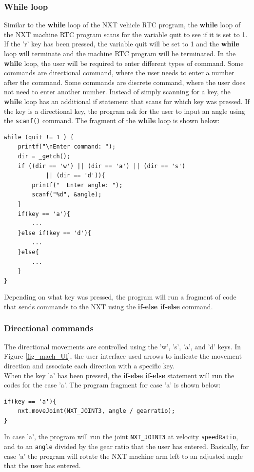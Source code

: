 \documentclass[11pt]{article}
\begin{document}
\subsubsection*{While loop}
Similar to the {\bf while} loop of the NXT vehicle RTC program, the {\bf while} 
loop of the NXT machine RTC program scans for the variable quit to see if it is 
set to 1. If the 'r' key has been pressed, the variable quit will be set to 1 
and the {\bf while} loop will terminate and the machine RTC program will be 
terminated. In the {\bf while} loop, the user will be required to enter different 
types of command. Some commands are directional command, where the user needs to 
enter a number after the command. Some commands are discrete command, where the 
user does not need to enter another number. Instead of simply scanning for a key, 
the {\bf while} loop has an additional if statement that scans for which key was 
pressed. If the key is a directional key, the program ask for the user to input an 
angle using the {\tt scanf()} command. The fragment of the {\bf while} loop is 
shown below:
\begin{lstlisting}
while (quit != 1 ) {
    printf("\nEnter command: ");
    dir = _getch();
    if ((dir == 'w') || (dir == 'a') || (dir == 's') 
            || (dir == 'd')){
        printf("  Enter angle: ");
        scanf("%d", &angle);
    }
    if(key == 'a'){
        ...
    }else if(key == 'd'){
        ...
    }else{
        ...
    }
}
\end{lstlisting}
Depending on what key was pressed, the program will run a fragment of code that 
sends commands to the NXT using the {\bf if-else if-else} command.

\subsubsection*{Directional commands}
The directional movements are controlled using the 'w', 's', 'a', and 'd' keys.
In Figure \ref{fig_mach_UI}, the user interface used arrows to indicate the 
movement direction and associate each direction with a specific key.\\

When the key 'a' has been pressed, the {\bf if-else if-else} statement will run 
the codes for the case 'a'. The program fragment for case 'a' is shown below:
\begin{lstlisting}
if(key == 'a'){
    nxt.moveJoint(NXT_JOINT3, angle / gearratio);
}
\end{lstlisting}
In case 'a', the program will run the joint {\tt NXT\_JOINT3} at velocity 
{\tt speedRatio}, and to an \verb+angle+ divided by the gear ratio that the user 
has entered. Basically, for case 'a' the program will rotate the NXT machine arm 
left to an adjusted angle that the user has entered.\\
\end{document}
